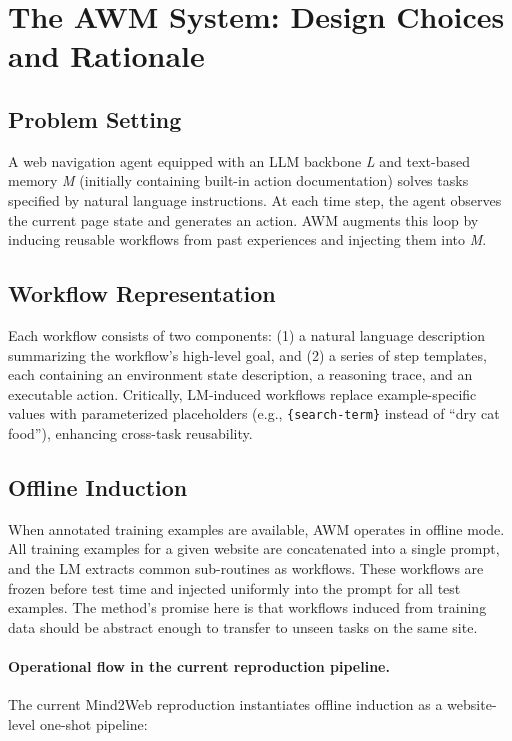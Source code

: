 \documentclass{article}
\begin{document}
\section{The AWM System: Design Choices and
Rationale}\label{the-awm-method}

\subsection{Problem Setting}\label{problem-setting}

A web navigation agent equipped with an LLM backbone \emph{L} and
text-based memory \emph{M} (initially containing built-in action
documentation) solves tasks specified by natural language instructions.
At each time step, the agent observes the current page state and
generates an action. AWM augments this loop by inducing reusable
workflows from past experiences and injecting them into \emph{M}.

\subsection{Workflow
Representation}\label{workflow-representation}

Each workflow consists of two components: (1) a natural language
description summarizing the workflow's high-level goal, and (2) a series
of step templates, each containing an environment state description, a
reasoning trace, and an executable action. Critically, LM-induced
workflows replace example-specific values with parameterized
placeholders (e.g., \texttt{\{search-term\}} instead of ``dry cat
food''), enhancing cross-task reusability.

\subsection{Offline Induction}\label{offline-induction}

When annotated training examples are available, AWM operates in offline
mode. All training examples for a given website are concatenated into a
single prompt, and the LM extracts common sub-routines as workflows.
These workflows are frozen before test time and injected uniformly into
the prompt for all test examples. The method's promise here is that
workflows induced from training data should be abstract enough to
transfer to unseen tasks on the same site.

\paragraph{Operational flow in the current reproduction pipeline.}
The current Mind2Web reproduction instantiates offline induction as a
website-level one-shot pipeline:
\end{document}
